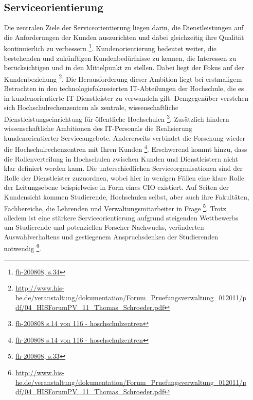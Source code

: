 \subsection{Serviceorientierung}
\label{subsection_serviceorientierung}
Die zentralen Ziele der Serviceorientierung liegen darin, die Dienstleistungen auf die Anforderungen der Kunden auszurichten und dabei gleichzeitig ihre Qualität kontinuierlich zu verbessern \footnote{\url{fh-200808, s.34}}. Kundenorientierung bedeutet weiter, die bestehenden und zukünftigen Kundenbedürfnisse zu kennen, die Interessen zu berücksichtigen und in den Mittelpunkt zu stellen. Dabei liegt der Fokus auf der Kundenbeziehung \footnote{\url{http://www.his-he.de/veranstaltung/dokumentation/Forum_Pruefungsverwaltung_012011/pdf/04_HISForumPV_11_Thomas_Schroeder.pdf}}. Die Herausforderung dieser Ambition liegt bei erstmaligem Betrachten in den technologiefokussierten IT-Abteilungen der Hochschule, die es in kundenorientierte IT-Dienstleister zu verwandeln gilt. Demgegenüber verstehen sich Hochschulrechenzentren als zentrale, wissenschaftliche Dienstleistungseinrichtung für öffentliche Hochschulen \footnote{\url{fh-200808 s.14 von 116 - hoschschulzentren}}. Zusätzlich hindern wissenschaftliche Ambitionen des IT-Personals die Realisierung kundenorientierter Serviceangebote. Andererseits verbindet die Forschung wieder die Hochschulrechenzentren mit Ihren Kunden \footnote{\url{fh-200808 s.14 von 116 - hoschschulzentren}}. Erschwerend kommt hinzu, dass die Rollenverteilung in Hochschulen zwischen Kunden und Dienstleistern nicht klar definiert werden kann. Die unterschiedlichen Serviceorganisationen sind der Rolle der Dienstleister zuzuordnen, wobei hier in wenigen Fällen eine klare Rolle der Leitungsebene beispielweise in Form eines CIO existiert. Auf Seiten der Kundensicht kommen Studierende, Hochschulen selbst, aber auch ihre Fakultäten, Fachbereiche, die Lehrenden und Verwaltungsmitarbeiter in Frage \footnote{\url{fh-200808, s.33}}. Trotz alledem ist eine stärkere Serviceorientierung aufgrund steigenden Wettbewerbs um Studierende und potenziellen Forscher-Nachwuchs, veränderten Auswahlverhaltens und gestiegenem Anspruchsdenken der Studierenden notwendig \footnote{\url{http://www.his-he.de/veranstaltung/dokumentation/Forum_Pruefungsverwaltung_012011/pdf/04_HISForumPV_11_Thomas_Schroeder.pdf}}.


